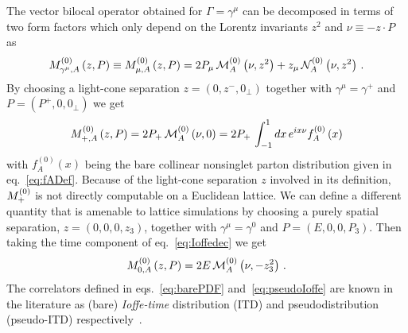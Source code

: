 The vector bilocal operator obtained for $\Gamma=\gamma^\mu$ can be decomposed  
in terms of two form factors which only depend on the Lorentz invariants $z^2$ and $\nu \equiv - z\cdot P$ as 
\begin{align}
	\label{eq:Ioffedec}	
	M^{(0)}_{\gamma^\mu,A}\left(z, P\right) \equiv M^{(0)}_{\mu,A}\left(z,P\right)    
     = 2 P_\mu\,\mathcal{M}_A^{(0)} \left( \nu,z^2 \right)
    + z_\mu\, \mathcal{N}_A^{(0)}\left( \nu,z^2 \right) \, .
\end{align}
By choosing a light-cone separation $z=\left(0,z^-,0_{\perp}\right)$ together with
$\gamma^{\mu}=\gamma^{+}$ and $P=\left(P^+,0,0_{\perp}\right)$ we get
\begin{align}
	\label{eq:barePDF}
	M^{(0)}_{+,A}\left(z, P\right)
	= 2 P_+\,\mathcal{M}_A^{(0)}\left( \nu,0 \right)
	= 2 P_+\, \int_{-1}^{1} dx\, e^{i x\nu} f_A^{(0)}\left(x\right)
\end{align}
with $f_A^{(0)}\left(x\right)$ being the bare collinear nonsinglet parton distribution given in eq.~\eqref{eq:fADef}.
Because of the light-cone separation $z$ involved in its definition,
$M^{(0)}_{+}$ is not directly computable on a Euclidean lattice. We can define a
different quantity that is amenable to lattice simulations  by choosing a purely
spatial separation, $z=\left(0,0,0,z_3\right)$, together with
$\gamma^{\mu}=\gamma^{0}$ and $P=\left(E,0,0,P_3\right)$. Then taking the time
component of eq.~\eqref{eq:Ioffedec} we get
\begin{align}
	\label{eq:pseudoIoffe}
	M^{(0)}_{0,A}\left(z, P\right) 
	= 2 E\,\mathcal{M}_A^{(0)}\left( \nu,-z_3^2 \right) \, .
\end{align}
The correlators defined in eqs.~\eqref{eq:barePDF} and~\eqref{eq:pseudoIoffe}
are known in the literature as (bare) \textit{Ioffe-time} distribution (ITD) and
pseudodistribution (pseudo-ITD)
respectively~\cite{Radyushkin:2017cyf,Braun:1994jq}. 

